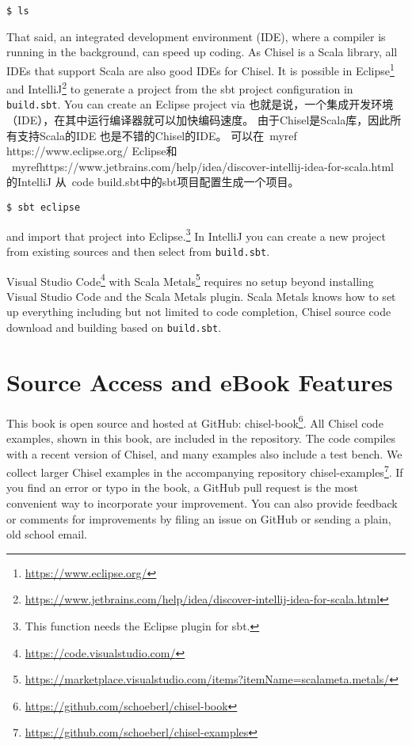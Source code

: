 \documentclass[%
    10pt,
    headinclude, footexclude,
    openright, %
    notitlepage,
    cleardoubleempty,
    headsepline,
    pointlessnumbers,
    bibtotoc, idxtotoc,
    ]{scrbook}
\newcommand{\code}[1]{{\small{\texttt{#1}}}}
\newcommand{\myref}[2]{\href{#1}{#2}}
\renewcommand{\myref}[2]{{#2}{\footnote{\url{#1}}}}
\begin{document}
\begin{verbatim}
$ ls
\end{verbatim}

That said, an integrated development environment (IDE), where a compiler is running in
the background, can speed up coding. As Chisel is a Scala library, all IDEs
that support Scala are also good IDEs for Chisel.
It is possible in \myref{https://www.eclipse.org/}{Eclipse} and
\myref{https://www.jetbrains.com/help/idea/discover-intellij-idea-for-scala.html}{IntelliJ}
to generate a project from the sbt project configuration in \code{build.sbt}.
You can create an Eclipse project via
也就是说，一个集成开发环境（IDE），在其中运行编译器就可以加快编码速度。 由于Chisel是Scala库，因此所有支持Scala的IDE
也是不错的Chisel的IDE。
可以在\ myref {https://www.eclipse.org/} {Eclipse}和
\ myref{https://www.jetbrains.com/help/idea/discover-intellij-idea-for-scala.html} {}的IntelliJ
从\ code {build.sbt}中的sbt项目配置生成一个项目。

\begin{verbatim}
$ sbt eclipse
\end{verbatim}
and import that project into Eclipse.\footnote{This function needs the Eclipse plugin for sbt.}
In IntelliJ you can create a new project from existing sources and then select from \code{build.sbt}.

\myref{https://code.visualstudio.com/}{Visual Studio Code} with
\myref{https://marketplace.visualstudio.com/items?itemName=scalameta.metals/}{Scala Metals} requires
no setup beyond installing Visual Studio Code and the Scala Metals plugin. Scala Metals knows how to
set up everything including but not limited to code completion, Chisel source code download and
building based on \code{build.sbt}.

\section{Source Access and eBook Features}

This book is open source and hosted at GitHub: \myref{https://github.com/schoeberl/chisel-book}{chisel-book}.
All Chisel code examples, shown in this book, are included in the repository.
The code compiles with a recent version of Chisel, and many examples also include a test bench.
We collect larger Chisel examples in the accompanying repository \myref{https://github.com/schoeberl/chisel-examples}{chisel-examples}. If you find an error or typo in the book, a GitHub pull request is the most convenient way to incorporate your improvement.
You can also provide feedback or comments for improvements by filing an issue on GitHub
or sending a plain, old school email.
\end{document}
